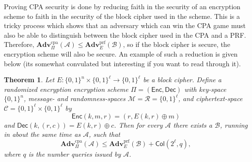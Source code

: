 \documentclass[11pt]{article}
\newtheorem{theorem}{Theorem}
\newcommand{\msgs}{\mathcal{M}}
\newcommand{\ctxts}{\mathcal{C}}
\newcommand{\rands}{\mathcal{R}}
\newcommand{\Enc}{\mathsf{Enc}}
\newcommand{\Dec}{\mathsf{Dec}}
\newcommand{\calA}{\mathcal{A}}
\newcommand{\calB}{\mathcal{B}}
\newcommand{\Adv}{\mathbf{Adv}}
\newcommand{\AdvPRF}[2]{\Adv^{\mathrm{prf}}_{#1}({#2})}
\newcommand{\AdvCPA}[2]{\Adv^{\mathrm{cpa}}_{#1}({#2})}
\newcommand{\bits}{\{0,1\}}
\newcommand{\Col}{\mathsf{Col}}
\begin{document}
Proving CPA security is done by reducing faith in the security of an encryption scheme to faith in the security of the block cipher used in the scheme. This is a tricky process which shows that an adversary which can win the CPA game must also be able to distinguish between the block cipher used in the CPA and a PRF. Therefore, $\AdvCPA{\Pi}{\calA} \leq \AdvPRF{E}{\calB}$, so if the block cipher is secure, the encryption scheme will also be secure. An example of such a reduction is given below (its somewhat convulated but interesting if you want to read through it).

\begin{theorem}
	Let $E:\bits^n\times\bits^\ell\to\bits^\ell$ be a block cipher. 
	Define a randomized encryption encryption scheme 
	$\Pi=(\Enc,\Dec)$ with key-space $\bits^n$, message-
	and randomness-spaces $\msgs=\rands=\bits^\ell$, and ciphertext-space
	$\ctxts=\bits^\ell\times\bits^\ell$ by
	\[
	\Enc(k,m,r)=(r,E(k,r)\oplus m)
	\]
	and $\Dec(k,(r,c)) = E(k,r)\oplus c$. Then for every $\calA$ there
	exists a $\calB$, running in about the same time as $\calA$, such
	that
	\[
	\AdvCPA{\Pi}{\calA} \leq \AdvPRF{E}{\calB} + \Col(2^\ell,q),
	\]
	where $q$ is the number queries issued by $\calA$.
\end{theorem}
\end{document}
